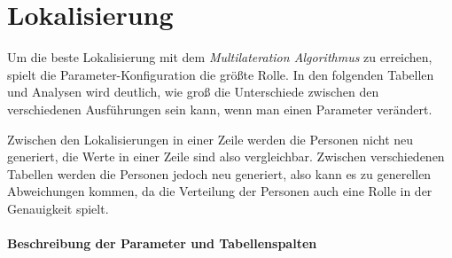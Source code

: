 \section{Lokalisierung}

Um die beste Lokalisierung mit dem \emph{Multilateration Algorithmus} zu erreichen, spielt die Parameter-Konfiguration die größte Rolle. In den folgenden Tabellen und Analysen wird deutlich, wie groß die Unterschiede zwischen den verschiedenen Ausführungen sein kann, wenn man einen Parameter verändert. \par
Zwischen den Lokalisierungen in einer Zeile werden die Personen nicht neu generiert, die Werte in einer Zeile sind also vergleichbar. Zwischen verschiedenen Tabellen werden die Personen jedoch neu generiert, also kann es zu generellen Abweichungen kommen, da die Verteilung der Personen auch eine Rolle in der Genauigkeit spielt.

\paragraph{Beschreibung der Parameter und Tabellenspalten}

